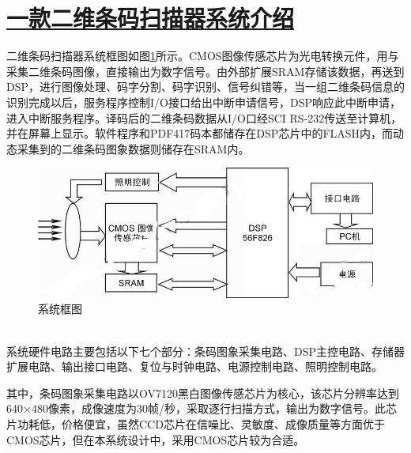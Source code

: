 \documentclass[a4paper,11pt]{article}
\begin{document}
\section{\href{https://www.eefocus.com/embedded/311751/r0}{一款二维条码扫描器系统介绍}}
二维条码扫描器系统框图如图\ref{fig:sys}所示。CMOS图像传感芯片为光电转换元件，用与采集二维条码图像，直接输出为数字信号。由外部扩展SRAM存储该数据，再送到DSP，进行图像处理、码字分割、码字识别、信号纠错等，当一组二维条码信息的识别完成以后，服务程序控制I/O接口给出中断申请信号，DSP响应此中断申请，进入中断服务程序。译码后的二维条码数据从I/O口经SCI RS-232传送至计算机，并在屏幕上显示。软件程序和PDF417码本都储存在DSP芯片中的FLASH内，而动态采集到的二维条码图象数据则储存在SRAM内。
	\begin{figure}
               \begin{center}
               \includegraphics[scale=0.5]{sys.jpg}
               \caption{系统框图}
               \label{fig:sys}
               \end{center}
         \end{figure}
\\
        
系统硬件电路主要包括以下七个部分：条码图象采集电路、DSP主控电路、存储器扩展电路、输出接口电路、复位与时钟电路、电源控制电路、照明控制电路。

其中，条码图象采集电路以OV7120黑白图像传感芯片为核心，该芯片分辨率达到640×480像素，成像速度为30帧/秒，采取逐行扫描方式，输出为数字信号。此芯片功耗低，价格便宜，虽然CCD芯片在信噪比、灵敏度、成像质量等方面优于CMOS芯片，但在本系统设计中，采用CMOS芯片较为合适。
\end{document}
